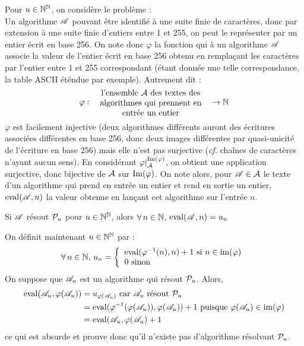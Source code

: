 		Pour \(u\in\bb{N}^\bb{N}\), on considère le problème : \!\! \\[3.5mm]
		Un algorithme \(\scr{A}\) pouvant être identifié à une suite finie de caractères, donc par extension à une suite finie d'entiers entre 1 et 255, on peut le représenter par un entier écrit en base 256. \nt
		\eqskip{4mm}
		On note donc \(\varphi\) la fonction qui à un algorithme \(\scr{A}\) associe la valeur de l'entier écrit en base 256 obtenu en remplaçant les caractères par l'entier entre 1 et 255 correspondant (étant donnée une telle correspondance, la table ASCII éténdue par exemple). Autrement dit :
			\[
				\varphi : \hs{-2} \begin{tabular}[h]{l}
					\parbox{50mm}{\centering l'ensemble \(\cal{A}\) des textes des algorithmes qui prennent en entrée un entier}
				\end{tabular} \hs{-2} \rightarrow \bb{N}
			\]
		\(\varphi\) est facilement injective (deux algorithmes différents auront des écritures associées différentes en base 256, donc deux images différentes par quasi-unicité de l'écriture en base 256) mais elle n'est pas surjective (\emph{cf.} chaînes de caractères n'ayant aucun sens). \nll
		En considérant \(\varphi|_\cal{A}^{\rm{Im}(\varphi)}\), on obtient une application surjective, donc bijective de \(\cal{A}\) sur \(\rm{Im}(\varphi)\). \nt
		On note alors, pour \(\scr{A}\in\cal{A}\) le texte d'un algorithme qui prend en entrée un entier et rend en sortie un entier, \(\eval(\scr{A},n)\) la valeur obtenue en lançant cet algorithme sur l'entrée \(n\).
		
		\begin{Remarque}
			Si \(\scr{A}\) résout \(\cal{P}_u\) pour \(u\in\bb{N}^\bb{N}\), alors \(\forall\,n\in\bb{N}\), \(\eval(\scr{A},n) = u_n\)
		\end{Remarque}
		
		\colsep{2.2pt}
		\eqskip{3mm}
		On définit maintenant \(u\in\bb{N}^\bb{N}\) par :
			\[
				\forall\,n\in\bb{N},\, u_n = \left\{ \hspace{-0.2mm}\begin{tabular}[h]{l}
					\(\eval(\varphi^{-1}(n),n)+1\) si \(n\in\im(\varphi)\) \\
					\(0\) sinon
				\end{tabular} \right.
			\]
		On suppose que \(\scr{A}_u\) est un algorithme qui résout \(\cal{P}_u\). Alors,
			\begin{align*}
				\eval(\scr{A}_u,\varphi(\scr{A}_u)) & = u_{\varphi(\scr{A}_u)} \text{ car \(\scr{A}_u\) résout \(\cal{P}_u\)} \\
				& = \eval(\varphi^{-1}(\varphi(\scr{A}_u)),\varphi(\scr{A}_u)) + 1 \text{ puisque \(\varphi(\scr{A}_u)\in\im(\varphi)\)} \\
				& = \eval(\scr{A}_u,\varphi(\scr{A}_u)+1
			\end{align*}
		ce qui est absurde et prouve donc qu'il n'existe pas d'algorithme résolvant \(\cal{P}_u\).
		
